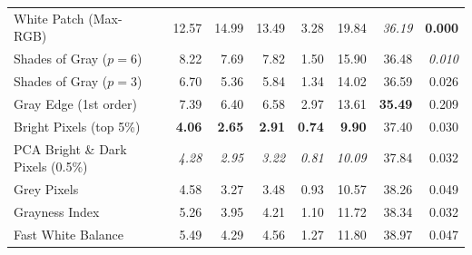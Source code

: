 \begin{longtable}{@{}>{\raggedright\arraybackslash}p{6.8cm}rrrrrrr@{}}
White Patch (Max-RGB)~\cite{white_patch} & 12.57 & 14.99 & 13.49 & 3.28 & 19.84 & \textit{36.19} & \textbf{0.000} \\
Shades of Gray ($p=6$)~\cite{shades_of_gray} & 8.22 & 7.69 & 7.82 & 1.50 & 15.90 & 36.48 & \textit{0.010} \\
Shades of Gray ($p=3$)~\cite{shades_of_gray} & 6.70 & 5.36 & 5.84 & 1.34 & 14.02 & 36.59 & 0.026 \\
Gray Edge (1st order)~\cite{gray_edge} & 7.39 & 6.40 & 6.58 & 2.97 & 13.61 & \textbf{35.49} & 0.209 \\
Bright Pixels (top 5\%)~\cite{bright_pixels} & \textbf{4.06} & \textbf{2.65} & \textbf{2.91} & \textbf{0.74} & \textbf{9.90} & 37.40 & 0.030 \\
PCA Bright \& Dark Pixels (0.5\%)~\cite{cheng2014illuminant} & \textit{4.28} & \textit{2.95} & \textit{3.22} & \textit{0.81} & \textit{10.09} & 37.84 & 0.032 \\
Grey Pixels~\cite{yangGrayPixels} & 4.58 & 3.27 & 3.48 & 0.93 & 10.57 & 38.26 & 0.049 \\
Grayness Index~\cite{qianFindingGrayPixels} & 5.26 & 3.95 & 4.21 & 1.10 & 11.72 & 38.34 & 0.032 \\
Fast White Balance~\cite{fast_wb_greyness} & 5.49 & 4.29 & 4.56 & 1.27 & 11.80 & 38.97 & 0.047 \\
\end{longtable}
\endgroup

